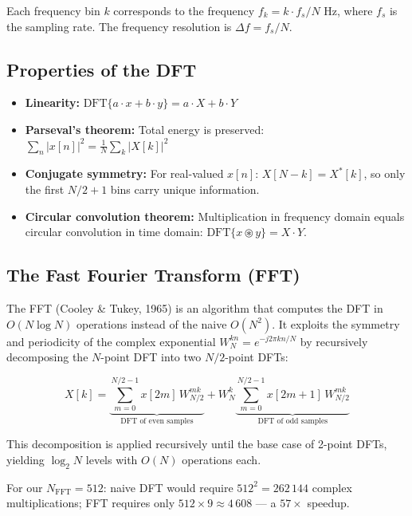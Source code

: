 \documentclass[12pt]{report}
\begin{document}
Each frequency bin $k$ corresponds to the frequency $f_k = k \cdot f_s / N$ Hz, where
$f_s$ is the sampling rate. The frequency resolution is $\Delta f = f_s / N$.

\subsection{Properties of the DFT}

\begin{itemize}
    \item \textbf{Linearity:} $\text{DFT}\{a \cdot x + b \cdot y\} = a \cdot X + b \cdot Y$
    \item \textbf{Parseval's theorem:} Total energy is preserved:
          $\sum_n |x[n]|^2 = \frac{1}{N} \sum_k |X[k]|^2$
    \item \textbf{Conjugate symmetry:} For real-valued $x[n]$: $X[N-k] = X^*[k]$, so only
          the first $N/2 + 1$ bins carry unique information.
    \item \textbf{Circular convolution theorem:} Multiplication in frequency domain equals
          circular convolution in time domain: $\text{DFT}\{x \circledast y\} = X \cdot Y$.
\end{itemize}

\subsection{The Fast Fourier Transform (FFT)}

The FFT (Cooley \& Tukey, 1965) is an algorithm that computes the DFT in $O(N \log N)$
operations instead of the naive $O(N^2)$. It exploits the symmetry and periodicity of the
complex exponential $W_N^{kn} = e^{-j2\pi kn/N}$ by recursively decomposing the $N$-point
DFT into two $N/2$-point DFTs:

\begin{equation}
    X[k] = \underbrace{\sum_{m=0}^{N/2-1} x[2m] \, W_{N/2}^{mk}}_{\text{DFT of even samples}}
         + W_N^k \underbrace{\sum_{m=0}^{N/2-1} x[2m+1] \, W_{N/2}^{mk}}_{\text{DFT of odd samples}}
\end{equation}

This decomposition is applied recursively until the base case of 2-point DFTs, yielding
$\log_2 N$ levels with $O(N)$ operations each.

For our $N_\text{FFT} = 512$: naive DFT would require $512^2 = 262\,144$ complex multiplications;
FFT requires only $512 \times 9 \approx 4\,608$ --- a $57\times$ speedup.
\end{document}
